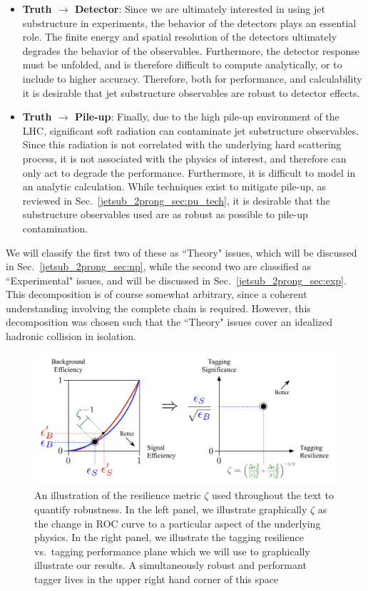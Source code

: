 \documentclass[11pt]{cernrep}
\begin{document}
\begin{itemize}
%
\item {\bf Truth $\to$ Detector}: Since we are ultimately interested in using jet substructure in experiments, the behavior of the detectors plays an essential role.
%
The finite energy and spatial resolution of the detectors ultimately degrades the behavior of the observables.
%
Furthermore, the detector response must be unfolded, and is therefore difficult to compute analytically, or to include to higher accuracy. Therefore, both for performance, and calculability it is desirable that jet substructure observables are robust to detector effects.
%
\item {\bf Truth $\to$ Pile-up}: Finally, due to the high pile-up environment of the LHC, significant soft radiation can contaminate jet substructure observables.
%
Since this radiation is not correlated with the underlying hard scattering process, it is not associated with the physics of interest, and therefore can only act to degrade the performance.
%
Furthermore, it is difficult to model in an analytic calculation.
%
While techniques exist to mitigate pile-up, as reviewed in Sec.~\ref{jetsub_2prong_sec:pu_tech}, it is desirable that the substructure observables used are as robust as possible to pile-up contamination.
%
\end{itemize}
%
We will classify the first two of these as ``Theory" issues, which will be discussed in Sec.~\ref{jetsub_2prong_sec:np}, while the second two are classified as ``Experimental" issues, and will be discussed in Sec.~\ref{jetsub_2prong_sec:exp}. This decomposition is of course somewhat arbitrary, since a coherent understanding involving the complete chain is required. However, this decomposition was chosen such that the ``Theory" issues cover an idealized hadronic collision in isolation. 

\begin{figure}[t]
\begin{center}
\includegraphics[width=1.0\columnwidth]{jetsub_2prong_roc_to_significance}
\end{center}
\caption{An illustration of the resilience metric $\zeta$ used throughout the text to quantify robustness. In the left panel, we illustrate graphically $\zeta$ as the change in ROC curve to a particular aspect of the underlying physics. In the right panel, we illustrate the tagging resilience vs.\ tagging performance plane which we will use to graphically illustrate our results.  A simultaneously robust and performant tagger lives in the upper right hand corner of this space}
\label{jetsub_2prong_fig:zeta_def}
\end{figure}
\end{document}
